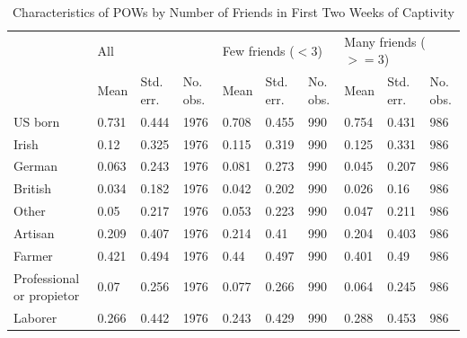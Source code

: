 \documentclass[draft.tex]{subfiles}
\begin{document}
\begin{table}
\caption{Characteristics of POWs by Number of Friends in First Two Weeks of Captivity}
\label{friends}
\begin{tabular}{llllllllll}

                                  & \multicolumn{3}{l}{All} & \multicolumn{3}{l}{Few friends ($<3$)} & \multicolumn{3}{l}{Many friends ($>=3$)} \\
                                  & Mean                    & Std. err.                            & No. obs.                               & Mean & Std. err. & No. obs. & Mean & Std. err. & No. obs. \\
US born                           & 0.731                   & 0.444                                & 1976                                   & 0.708 & 0.455 & 990 & 0.754 & 0.431 & 986 \\
Irish                             & 0.12                    & 0.325                                & 1976                                   & 0.115 & 0.319 & 990 & 0.125 & 0.331 & 986 \\
German                            & 0.063                   & 0.243                                & 1976                                   & 0.081 & 0.273 & 990 & 0.045 & 0.207 & 986 \\
British                           & 0.034                   & 0.182                                & 1976                                   & 0.042 & 0.202 & 990 & 0.026 & 0.16 & 986 \\
Other                             & 0.05                    & 0.217                                & 1976                                   & 0.053 & 0.223 & 990 & 0.047 & 0.211 & 986 \\
Artisan                           & 0.209                   & 0.407                                & 1976                                   & 0.214 & 0.41 & 990 & 0.204 & 0.403 & 986 \\
Farmer                            & 0.421                   & 0.494                                & 1976                                   & 0.44 & 0.497 & 990 & 0.401 & 0.49 & 986 \\
Professional or propietor         & 0.07                    & 0.256                                & 1976                                   & 0.077 & 0.266 & 990 & 0.064 & 0.245 & 986 \\
Laborer                           & 0.266                   & 0.442                                & 1976                                   & 0.243 & 0.429 & 990 & 0.288 & 0.453 & 986 \\

\end{tabular}
\end{table}
\end{document}
